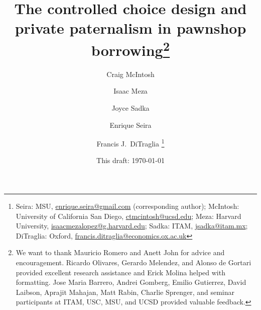 \documentclass[oneside,11pt]{article}
\begin{document}
\title{The controlled choice design and private paternalism in pawnshop borrowing\thanks{We want to thank Mauricio Romero and Anett John for advice and encouragement. Ricardo Olivares, Gerardo Melendez, and Alonso de Gortari provided excellent research assistance and Erick Molina helped with formatting. Jose Maria Barrero, Andrei Gomberg, Emilio Gutierrez, David Laibson, Aprajit Mahajan, Matt Rabin, Charlie Sprenger, and seminar participants at ITAM, USC, MSU, and UCSD provided valuable feedback.}}
\author{Craig McIntosh \and Isaac Meza \and Joyce Sadka \and Enrique Seira \and Francis J.\ DiTraglia   \thanks{Seira:  MSU, \url{enrique.seira@gmail.com} (corresponding author); McIntosh:  University of California San Diego, \url{ctmcintosh@ucsd.edu}; Meza: Harvard University, \url{isaacmezalopez@g.harvard.edu}; Sadka: ITAM, \url{jsadka@itam.mx}; DiTraglia: Oxford, \url{francis.ditraglia@economics.ox.ac.uk}} }
\date{This draft:  \today \\[2 cm]}

\end{document}
